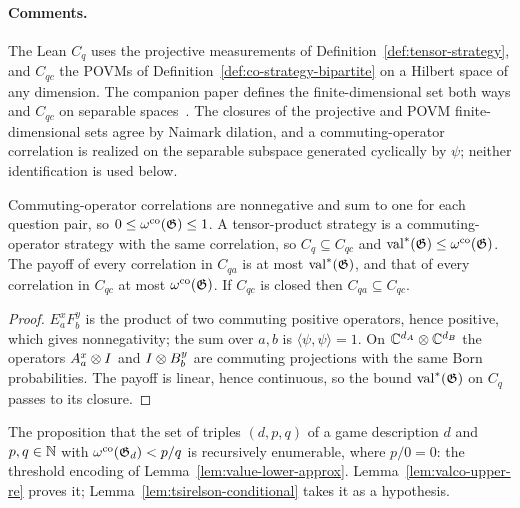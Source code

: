\paragraph{Comments.} The Lean $C_q$ uses the projective measurements of
Definition~\ref{def:tensor-strategy}, and $C_{qc}$ the POVMs of
Definition~\ref{def:co-strategy-bipartite} on a Hilbert space of any dimension. The
companion paper defines the finite-dimensional set both ways and $C_{qc}$ on separable
spaces~\cite{AuditSync26}. The closures of the projective and POVM finite-dimensional sets
agree by Naimark dilation, and a commuting-operator correlation is realized on the
separable subspace generated cyclically by $\psi$; neither identification is used below.

\begin{lemma}
\label{lem:correlation-sets-basic}
\leanok
Commuting-operator correlations are nonnegative and sum to one for each question pair, so
$0 \leq \omega^{\mathrm{co}}(\mathfrak{G}) \leq 1$. A tensor-product strategy is a commuting-operator strategy
with the same correlation, so $C_q \subseteq C_{qc}$ and
$\mathrm{val}^*(\mathfrak{G}) \leq \omega^{\mathrm{co}}(\mathfrak{G})$. The payoff of every correlation in $C_{qa}$ is at
most $\mathrm{val}^*(\mathfrak{G})$, and that of every correlation in $C_{qc}$ at most
$\omega^{\mathrm{co}}(\mathfrak{G})$. If $C_{qc}$ is closed then $C_{qa} \subseteq C_{qc}$.
\end{lemma}

\begin{proof}
\leanok
$E^x_a F^y_b$ is the product of two commuting positive operators, hence positive, which
gives nonnegativity; the sum over $a, b$ is $\langle \psi, \psi \rangle = 1$. On
$\mathbb{C}^{d_A} \otimes \mathbb{C}^{d_B}$ the operators $A^x_a \otimes I$ and $I \otimes B^y_b$ are commuting
projections with the same Born probabilities. The payoff is linear, hence continuous, so
the bound $\mathrm{val}^*(\mathfrak{G})$ on $C_q$ passes to its closure.
\end{proof}

\begin{definition}
\label{def:commuting-upper-re}
\leanok
The proposition that the set of triples $(d, p, q)$ of a game description $d$ and
$p, q \in \mathbb{N}$ with $\omega^{\mathrm{co}}(\mathfrak{G}_d) < p/q$ is recursively enumerable, where $p/0 = 0$: the
threshold encoding of Lemma~\ref{lem:value-lower-approx}. Lemma~\ref{lem:valco-upper-re}
proves it; Lemma~\ref{lem:tsirelson-conditional} takes it as a hypothesis.
\end{definition}

